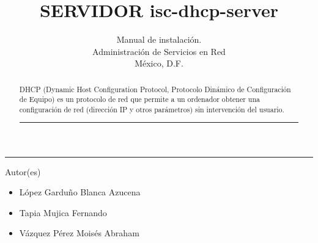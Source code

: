 \title{SERVIDOR isc-dhcp-server}
\author{Manual de instalación.\\
\small Administración de Servicios en Red\\
\small México, D.F.
}

\vspace{2cm}
\maketitle		
	\vspace*{-1cm}
	\begin{center}\rule{0.9\textwidth}{0.1mm}\end{center}
	\begin{abstract}
	\normalsize DHCP (Dynamic Host Configuration Protocol, Protocolo Dinámico de Configuración de Equipo) es un protocolo de red que permite a un ordenador obtener una configuración de red (dirección IP y otros parámetros) sin intervención del usuario.
	\begin{center}\rule{0.9\textwidth}{0.1mm}\end{center}
	\vspace*{0.5cm}
	\end{abstract}
	\vspace*{9cm}
\small Autor(es)
\begin{itemize}
	\item López Garduño Blanca Azucena
	\item Tapia Mujica Fernando
	\item Vázquez Pérez Moisés Abraham
\end{itemize}